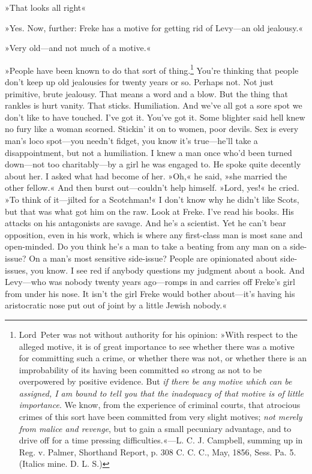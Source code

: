 »That looks all right\longdash«

»Yes. Now, further: Freke has a motive for getting rid of Levy—an old jealousy.«

»Very old—and not much of a motive.«

»People have been known to do that sort of thing.\footnote{Lord~Peter was not without authority for his opinion: »With respect to the alleged motive, it is of great importance to see whether there was a motive for committing such a crime, or whether there was not, or whether there is an improbability of its having been committed so strong as not to be overpowered by positive evidence. But \textit{if there be any motive which can be assigned, I am bound to tell you that the inadequacy of that motive is of little importance}. We know, from the experience of criminal courts, that atrocious crimes of this sort have been committed from very slight motives; \textit{not merely from malice and revenge}, but to gain a small pecuniary advantage, and to drive off for a time pressing difficulties.«—L. C. J. Campbell, summing up in Reg. v. Palmer, Shorthand Report, p. 308 C. C. C., May, 1856, Sess. Pa. 5. (Italics mine. D. L. S.)}	You're thinking that people don't keep up old jealousies for twenty years or so. Perhaps not. Not just primitive, brute jealousy. That means a word and a blow. But the thing that rankles is hurt vanity. That sticks. Humiliation. And we've all got a sore spot we don't like to have touched. I've got it. You've got it. Some blighter said hell knew no fury like a woman scorned. Stickin' it on to women, poor devils. Sex is every man's loco spot—you needn't fidget, you know it's true—he'll take a disappointment, but not a humiliation. I knew a man once who'd been turned down—not too charitably—by a girl he was engaged to. He spoke quite decently about her. I asked what had become of her. »Oh,« he said, »she married the other fellow.« And then burst out—couldn't help himself. »Lord, yes!« he cried. »To think of it—jilted for a Scotchman!« I don't know why he didn't like Scots, but that was what got him on the raw. Look at Freke. I've read his books. His attacks on his antagonists are savage. And he's a scientist. Yet he can't bear opposition, even in his work, which is where any first-class man is most sane and open-minded. Do you think he's a man to take a beating from any man on a side-issue? On a man's most sensitive side-issue? People are opinionated about side-issues, you know. I see red if anybody questions my judgment about a book. And Levy—who was nobody twenty years ago—romps in and carries off Freke's girl from under his nose. It isn't the girl Freke would bother about—it's having his aristocratic nose put out of joint by a little Jewish nobody.«

